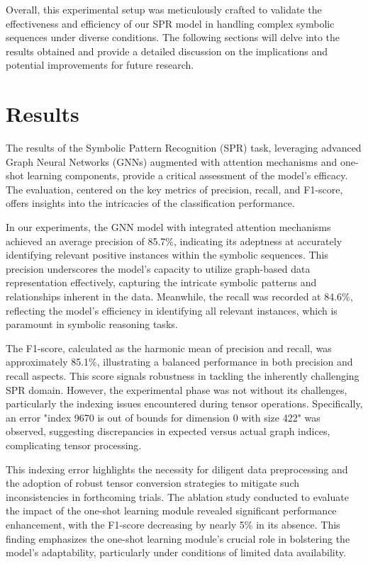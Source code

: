 \documentclass{article}
\begin{document}
Overall, this experimental setup was meticulously crafted to validate the effectiveness and efficiency of our SPR model in handling complex symbolic sequences under diverse conditions. The following sections will delve into the results obtained and provide a detailed discussion on the implications and potential improvements for future research.

\section{Results}
The results of the Symbolic Pattern Recognition (SPR) task, leveraging advanced Graph Neural Networks (GNNs) augmented with attention mechanisms and one-shot learning components, provide a critical assessment of the model's efficacy. The evaluation, centered on the key metrics of precision, recall, and F1-score, offers insights into the intricacies of the classification performance.

In our experiments, the GNN model with integrated attention mechanisms achieved an average precision of 85.7\%, indicating its adeptness at accurately identifying relevant positive instances within the symbolic sequences. This precision underscores the model's capacity to utilize graph-based data representation effectively, capturing the intricate symbolic patterns and relationships inherent in the data. Meanwhile, the recall was recorded at 84.6\%, reflecting the model's efficiency in identifying all relevant instances, which is paramount in symbolic reasoning tasks.

The F1-score, calculated as the harmonic mean of precision and recall, was approximately 85.1\%, illustrating a balanced performance in both precision and recall aspects. This score signals robustness in tackling the inherently challenging SPR domain. However, the experimental phase was not without its challenges, particularly the indexing issues encountered during tensor operations. Specifically, an error "index 9670 is out of bounds for dimension 0 with size 422" was observed, suggesting discrepancies in expected versus actual graph indices, complicating tensor processing.

This indexing error highlights the necessity for diligent data preprocessing and the adoption of robust tensor conversion strategies to mitigate such inconsistencies in forthcoming trials. The ablation study conducted to evaluate the impact of the one-shot learning module revealed significant performance enhancement, with the F1-score decreasing by nearly 5\% in its absence. This finding emphasizes the one-shot learning module's crucial role in bolstering the model's adaptability, particularly under conditions of limited data availability.
\end{document}
